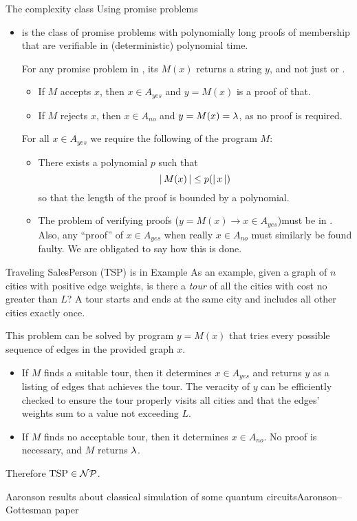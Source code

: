 \begin{frame}{The complexity class }{Using promise problems}

\begin{itemize}
    \item[\CompClass{NP}] is the class of promise problems with polynomially long proofs of membership that are verifiable in (deterministic) polynomial time.   
    
    For any promise problem in , its $M(x)$ returns a string $y$, and not just \True{} or \False{}.
    \begin{itemize}
        \item If $M$ accepts $x$, then $x\in A_{yes}$ and $y=M(x)$ is a proof of that.  
        \item If $M$ rejects $x$, then $x\in A_{no}$ and $y=M(x)=\lambda$, as no proof is required.
    \end{itemize}
    \MedSkip{}
    For all $x \in A_{yes}$ we require the following of the program $M$:
    \begin{itemize}
        \item There exists a polynomial $p$ such that \[|\,M(x)\,| \leq p(|\,x\,|)\]
        so that the length of the proof is bounded by a polynomial.
        \item  The problem of verifying proofs ($y=M(x)\rightarrow x\in A_{yes}$)must be in .  Also, any  ``proof'' of $x\in A_{yes}$ when really $x\in A_{no}$ must similarly be found faulty.
        We are obligated to say how this is done.
    \end{itemize}
    
\end{itemize}
\end{frame}
\begin{frame}{Traveling SalesPerson (TSP) is in }{Example}
As an example, given a graph of $n$ cities with positive edge weights, is there a \emph{tour} of all the cities with cost no greater than $L$?  A tour starts and ends at the same city and includes all other cities exactly once.

This problem can be solved by program $y=M(x)$ that tries every possible sequence of edges in the provided graph $x$.
\begin{itemize}
    \item If $M$ finds a suitable tour, then it determines $x\in A_{yes}$ and returns $y$ as a listing of edges that achieves the tour.  The veracity of $y$ can be efficiently checked to ensure the tour properly visits all cities and that the edges' weights sum to a value not exceeding $L$.
    \item If $M$ finds no acceptable tour, then it determines $x \in A_{no}$.  No proof is necessary, and $M$ returns $\lambda{}$.
\end{itemize}
Therefore $\mbox{TSP}\in \mathcal{NP}$.
    
\end{frame}

\begin{frame}{Aaronson results about classical simulation of some quantum circuits}{Aaronson--Gottesman paper}
    
\end{frame}

